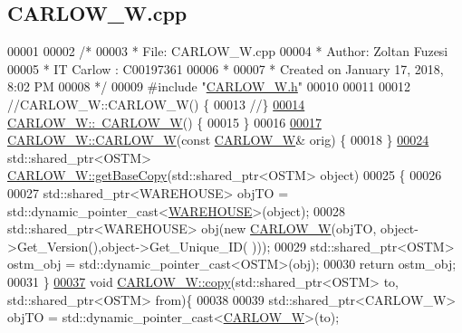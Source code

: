 \hypertarget{_c_a_r_l_o_w___w_8cpp_source}{}\subsection{C\+A\+R\+L\+O\+W\+\_\+\+W.\+cpp}

\begin{DoxyCode}
00001 
00002 \textcolor{comment}{/* }
00003 \textcolor{comment}{ * File:   CARLOW\_W.cpp}
00004 \textcolor{comment}{ * Author: Zoltan Fuzesi}
00005 \textcolor{comment}{ * IT Carlow : C00197361}
00006 \textcolor{comment}{ *}
00007 \textcolor{comment}{ * Created on January 17, 2018, 8:02 PM}
00008 \textcolor{comment}{ */}
00009 \textcolor{preprocessor}{#include "\hyperlink{_c_a_r_l_o_w___w_8h}{CARLOW\_W.h}"}
00010 
00011 
00012 \textcolor{comment}{//CARLOW\_W::CARLOW\_W() \{}
00013 \textcolor{comment}{//\}}
\hypertarget{_c_a_r_l_o_w___w_8cpp_source.tex_l00014}{}\hyperlink{class_c_a_r_l_o_w___w_aa628d46e58dfd0517f24499eca88138b}{00014} \hyperlink{class_c_a_r_l_o_w___w_aa628d46e58dfd0517f24499eca88138b}{CARLOW\_W::~CARLOW\_W}() \{
00015 \}
00016 
\hypertarget{_c_a_r_l_o_w___w_8cpp_source.tex_l00017}{}\hyperlink{class_c_a_r_l_o_w___w_a267a2792c59f475740a68953c8437205}{00017} \hyperlink{class_c_a_r_l_o_w___w_a8ae6ca6f4db7ea5240322fd27824c55a}{CARLOW\_W::CARLOW\_W}(\textcolor{keyword}{const} \hyperlink{class_c_a_r_l_o_w___w}{CARLOW\_W}& orig) \{
00018 \}
\hypertarget{_c_a_r_l_o_w___w_8cpp_source.tex_l00024}{}\hyperlink{class_c_a_r_l_o_w___w_a1a76566c3a7c01cf469007741dac6b97}{00024} std::shared\_ptr<OSTM> \hyperlink{class_c_a_r_l_o_w___w_a1a76566c3a7c01cf469007741dac6b97}{CARLOW\_W::getBaseCopy}(std::shared\_ptr<OSTM> \textcolor{keywordtype}{object})
00025 \{
00026 
00027     std::shared\_ptr<WAREHOUSE> objTO = std::dynamic\_pointer\_cast<\hyperlink{class_w_a_r_e_h_o_u_s_e}{WAREHOUSE}>(object);
00028     std::shared\_ptr<WAREHOUSE> obj(\textcolor{keyword}{new} \hyperlink{class_c_a_r_l_o_w___w_a8ae6ca6f4db7ea5240322fd27824c55a}{CARLOW\_W}(objTO, object->Get\_Version(),\textcolor{keywordtype}{object}->Get\_Unique\_ID(
      )));
00029     std::shared\_ptr<OSTM> ostm\_obj = std::dynamic\_pointer\_cast<OSTM>(obj);
00030     \textcolor{keywordflow}{return} ostm\_obj;
00031 \}
\hypertarget{_c_a_r_l_o_w___w_8cpp_source.tex_l00037}{}\hyperlink{class_c_a_r_l_o_w___w_ac91cb7cbae77752e334e273b97fb988b}{00037} \textcolor{keywordtype}{void} \hyperlink{class_c_a_r_l_o_w___w_ac91cb7cbae77752e334e273b97fb988b}{CARLOW\_W::copy}(std::shared\_ptr<OSTM> to, std::shared\_ptr<OSTM> from)\{
00038 
00039     std::shared\_ptr<CARLOW\_W> objTO = std::dynamic\_pointer\_cast<\hyperlink{class_c_a_r_l_o_w___w}{CARLOW\_W}>(to);

\end{DoxyCode}
